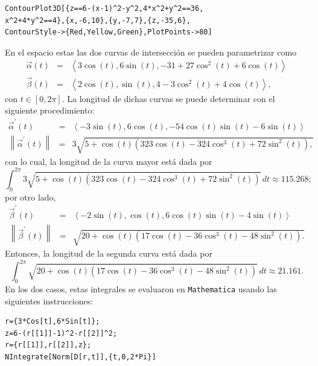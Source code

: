 \begin{tcolorbox}[title=\bf Instrucción \verb"Mathematica"]
\begin{Verbatim}[formatcom=\letraverbatim]
ContourPlot3D[{z==6-(x-1)^2-y^2,4*x^2+y^2==36,
x^2+4*y^2==4},{x,-6,10},{y,-7,7},{z,-35,6},
ContourStyle->{Red,Yellow,Green},PlotPoints->80]
\end{Verbatim}
\end{tcolorbox}

En el espacio estas las dos curvas de intersección se pueden parametrizar como
\begin{eqnarray*}
\overrightarrow{\alpha }(t) &=& \left\langle 3\cos (t) ,6\sin
(t) ,-31+27\cos ^{2}(t) +6\cos (t) \right\rangle \\
\overrightarrow{\beta }(t) &=& \left\langle 2\cos (t) ,\sin \left(
t\right) ,4-3\cos ^{2}(t) +4\cos (t) \right\rangle\!,
\end{eqnarray*}
con $t \in [0,2\pi]$.
La longitud de dichas curvas se puede determinar con el
siguiente procedimiento:
\begin{eqnarray*}
\overrightarrow{\alpha }^{\prime }(t)&=& \left\langle -3\sin (t),6\cos (t) ,-54\cos (t) \sin (t)
-6\sin (t) \right\rangle \\
\left\| \overrightarrow{\alpha }^{\prime }(t)\right\|
&=&  3\sqrt{5+\cos (t) \left( 323\cos(t) -324\cos ^{3}(t) +72\sin ^{2}(t)\right),}
\end{eqnarray*}
con lo cual, la longitud de la curva mayor está dada por
$$\int_{0}^{2\pi}3\sqrt{5+\cos (t) \left( 323\cos(t) -324\cos ^{3}(t) +72\sin ^{2}(t)\right) }  \,  dt\approx 115. 268;$$
por otro lado,
\begin{eqnarray*}
\overrightarrow{\beta }^{\prime }(t)&=& \left\langle -2\sin \left(
t\right) ,\cos (t) ,6\cos (t) \sin (t)-4\sin (t) \right\rangle \\
\left\| \overrightarrow{\beta }^{\prime }(t)\right\|
&=& \sqrt{20+\cos (t) \left( 17\cos (t)-36\cos ^{3}(t) -48\sin ^{2}(t) \right)\!.}
\end{eqnarray*}
Entonces, la longitud de la segunda curva está dada por
$$\int_{0}^{2\pi}\sqrt{20+\cos (t) \left( 17\cos (t)-36\cos ^{3}(t) -48\sin ^{2}(t) \right)} \, dt\approx 21.161.$$
En los dos casos, estas integrales se evaluaron en \verb"Mathematica"
usando las siguientes instrucciones:

\begin{tcolorbox}[title=\bf Instrucción \verb"Mathematica"]
\begin{Verbatim}[formatcom=\letraverbatim]
r={3*Cos[t],6*Sin[t]};
z=6-(r[[1]]-1)^2-r[[2]]^2;
r={r[[1]],r[[2]],z};
NIntegrate[Norm[D[r,t]],{t,0,2*Pi}]
\end{Verbatim}
\end{tcolorbox}

